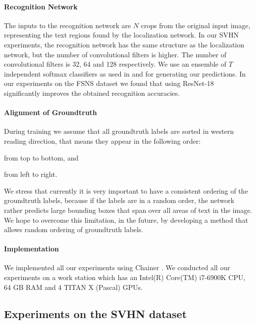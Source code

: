 \documentclass[letterpaper]{article}
\begin{document}
	\paragraph{Recognition Network}
	The inputs to the recognition network are $N$ crops from the original input image, representing the text regions found by the localization network.
	In our SVHN experiments, the recognition network has the same structure as the localization network, but the number of convolutional filters is higher.
	The number of convolutional filters is 32, 64 and 128 respectively.
	We use an ensemble of $T$ independent softmax classifiers as used in \cite{Goodfellow2014MultiDigit} and \cite{Jaderberg2014Deep} for generating our predictions.
	In our experiments on the FSNS dataset we found that using ResNet-18~\cite{He2016Deep} significantly improves the obtained recognition accuracies.

	\paragraph{Alignment of Groundtruth}
	During training we assume that all groundtruth labels are sorted in western reading direction, that means they appear in the following order:
	\begin{enumerate*}[label={\arabic*.}]
		\item from top to bottom, and
		\item from left to right.
	\end{enumerate*}
	We stress that currently it is very important to have a consistent ordering of the groundtruth labels, because if the labels are in a random order, the network rather predicts large bounding boxes that span over all areas of text in the image.
	We hope to overcome this limitation, in the future, by developing a method that allows random ordering of groundtruth labels.

	\paragraph{Implementation}
	We implemented all our experiments using Chainer \cite{chainer_learningsys2015}. We conducted all our experiments on a work station which has an Intel(R) Core(TM) i7-6900K CPU, 64 GB RAM and 4 TITAN X (Pascal) GPUs.

	\subsection{Experiments on the SVHN dataset}
	\label{ssec:svhn_experiments}
\end{document}
